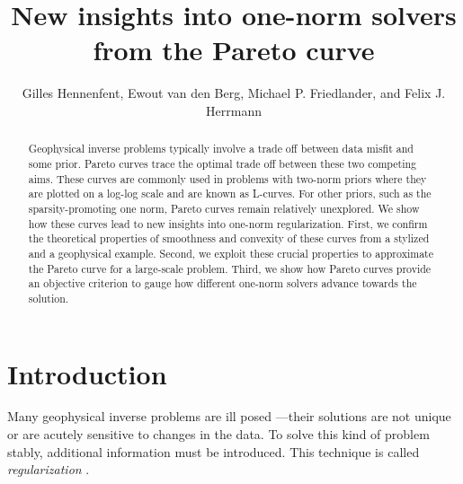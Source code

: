 \author{Gilles Hennenfent\footnotemark[1], Ewout van den
  Berg\footnotemark[2], Michael P. Friedlander\footnotemark[2], and
  Felix J. Herrmann\footnotemark[1]}


\title{New insights into one-norm solvers from the Pareto curve}


\maketitle

\begin{abstract}
  Geophysical inverse problems typically involve a trade off between
  data misfit and some prior. Pareto curves trace the optimal trade
  off between these two competing aims. These curves are commonly used
  in problems with two-norm priors where they are plotted on a log-log
  scale and are known as L-curves. For other priors, such as the
  sparsity-promoting one norm, Pareto curves remain relatively
  unexplored. We show how these curves lead to new insights into
  one-norm regularization. First, we confirm the theoretical
  properties of smoothness and convexity of these curves from a
  stylized and a geophysical example. Second, we exploit these crucial
  properties to approximate the Pareto curve for a large-scale
  problem. Third, we show how Pareto curves provide an objective
  criterion to gauge how different one-norm solvers advance towards
  the solution.
\end{abstract}

\section{Introduction}

\mbox{}\indent Many geophysical inverse problems are ill posed
\cite[][]{parker94}---their solutions are not unique or are acutely
sensitive to changes in the data. To solve this kind of problem
stably, additional information must be introduced. This technique is
called \textit{regularization} \cite[see,
e.g.,][]{phillips62,tikhonov63}.

